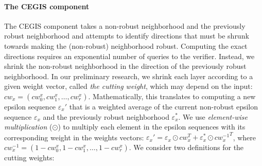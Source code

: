     \paragraph{The CEGIS component}
    The CEGIS component takes a non-robust neighborhood and the previously robust neighborhood and attempts to identify directions that must be shrunk towards making the (non-robust) neighborhood robust. %
    Computing the exact directions requires an exponential number of queries to the verifier.
    Instead, we shrink the non-robust neighborhood in the direction of the previously robust neighborhood.
    In our preliminary research,
    we shrink each layer according to a given weight vector, called \emph{the cutting weight}, which may depend on the input: $cw_x = (cw_0^x, cw_1^x, \ldots, cw_r^x)$.
    Mathematically, this translates to computing a new epsilon sequence $\varepsilon_x'$ that is a weighted average of the current non-robust epsilon sequence $\varepsilon_x$ and the previously robust neighborhood $\varepsilon_x^*$.
    We use \emph{element-wise multiplication} ($\odot$) to multiply each element in the epsilon sequences with its corresponding weight in the weights vectors:
    $
        {\varepsilon_x}' = \varepsilon_x \odot cw_x^T + \varepsilon_x^* \odot {cw_x^{-1}}^T
    $, where $ cw_x^{-1} = (1 - cw_0^x, 1 - cw_1^x, \ldots, 1 - cw_r^x)$. 
    We consider two definitions for the cutting weights:
